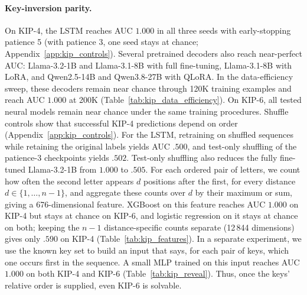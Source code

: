 \documentclass{article} %
\theoremstyle{plain}
\theoremstyle{definition}
\theoremstyle{remark}
\begin{document}
\paragraph{Key-inversion parity.}
On KIP-4, the LSTM reaches AUC $1.000$ in all three seeds with early-stopping patience 5 (with patience 3, one seed stays at chance; Appendix~\ref{app:kip_controls}). Several pretrained decoders also reach near-perfect AUC: Llama-3.2-1B and Llama-3.1-8B with full fine-tuning, Llama-3.1-8B with LoRA, and Qwen2.5-14B and Qwen3.8-27B with QLoRA. In the data-efficiency sweep, these decoders remain near chance through 120K training examples and reach AUC $1.000$ at 200K (Table~\ref{tab:kip_data_efficiency}). On KIP-6, all tested neural models remain near chance under the same training procedures. Shuffle controls show that successful KIP-4 predictions depend on order (Appendix~\ref{app:kip_controls}). For the LSTM, retraining on shuffled sequences while retaining the original labels yields AUC $.500$, and test-only shuffling of the patience-3 checkpoints yields $.502$. Test-only shuffling also reduces the fully fine-tuned Llama-3.2-1B from $1.000$ to $.505$. For each ordered pair of letters, we count how often the second letter appears $d$ positions after the first, for every distance $d\in\{1,\ldots,n-1\}$, and aggregate these counts over $d$ by their maximum or sum, giving a 676-dimensional feature. XGBoost on this feature reaches AUC $1.000$ on KIP-4 but stays at chance on KIP-6, and logistic regression on it stays at chance on both; keeping the $n-1$ distance-specific counts separate (12\,844 dimensions) gives only $.590$ on KIP-4 (Table~\ref{tab:kip_features}). In a separate experiment, we use the known key set to build an input that says, for each pair of keys, which one occurs first in the sequence. A small MLP trained on this input reaches AUC $1.000$ on both KIP-4 and KIP-6 (Table~\ref{tab:kip_reveal}). Thus, once the keys' relative order is supplied, even KIP-6 is solvable.
\end{document}
